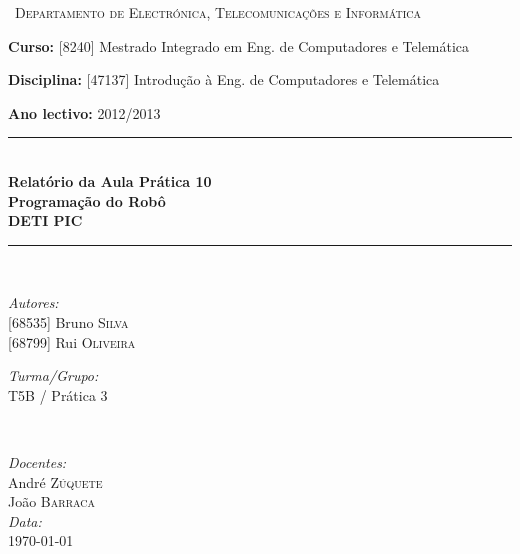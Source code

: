 \documentclass[a4paper, 12pt, onecolumn, oneside]{report}
\begin{document}
\begin{titlepage}

\newcommand{\HRule}{\rule{\linewidth}{0.4mm}}
\center 


\begin{figure}[H] 
\center{\texttt{[image: UA1]}}
\end{figure}


\textsc{\ Departamento de Electrónica, Telecomunicações e Informática
 }\\[0.9cm] 

{\raggedright \textbf{Curso:} [8240] Mestrado Integrado em Eng. de Computadores e Telemática

\textbf{Disciplina:} [47137] Introdução à Eng. de Computadores e Telemática

\textbf{Ano lectivo:} 2012/2013 \\[1cm] 

}


\HRule \\[0.1cm]
{ \huge \bfseries Relatório da Aula Prática 10 \\
[0.4cm]  
Programação do Robô \\ [0.4cm] DETI PIC }\\[0.4cm] 
\HRule \\[1cm]

\begin{minipage}{0.4\textwidth} 
\begin{flushleft} \large
\emph{Autores:}\\
{[68535] Bruno \textsc{Silva}} \\
{[68799] Rui \textsc{Oliveira} } 


\emph{Turma/Grupo:}\\
T5B / Prática 3\\

\end{flushleft}
\end{minipage}
~
\begin{minipage}{0.4\textwidth}
\begin{flushright} \large
\emph{Docentes:} \\
André \textsc{Zúquete} \\
João \textsc{Barraca} \\
\emph{Data:} \\
\today 
\end{flushright}
\end{minipage}\\[2cm]



\vfill 

\end{titlepage}
\end{document}
